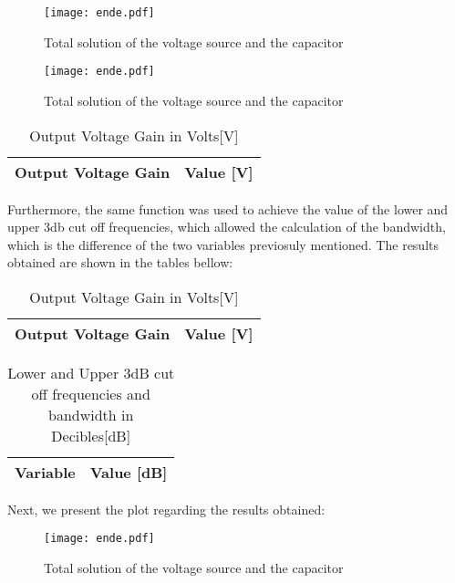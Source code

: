 \begin{figure}[H] \centering
\texttt{[image: ende.pdf]}
\caption{Total solution of the voltage source and the capacitor}
\label{fig:env+vore}
\end{figure}

\begin{figure}[H] \centering
\texttt{[image: ende.pdf]}
\caption{Total solution of the voltage source and the capacitor}
\label{fig:env+vore}
\end{figure}

\begin{table}[H]
  \centering
  \begin{tabular}{|l|r|}
    \hline    
    {\bf Output Voltage Gain} & {\bf Value [V]} \\ \hline
    
  \end{tabular}
  \caption{Output Voltage Gain in Volts[V]}
  \label{tab:gain}
\end{table}


Furthermore, the same function was used to achieve the value of the lower and upper 3db cut off frequencies, which allowed the calculation of the bandwidth, which is the difference of the two variables previosuly mentioned. The results obtained are shown in the tables bellow:

\begin{table}[H]
  \centering
  \begin{tabular}{|l|r|}
    \hline    
    {\bf Output Voltage Gain} & {\bf Value [V]} \\ \hline
    
  \end{tabular}
  \caption{Output Voltage Gain in Volts[V]}
  \label{tab:gain}
\end{table}

\begin{table}[H]
  \centering
  \begin{tabular}{|l|r|}
    \hline    
    {\bf Variable} & {\bf Value [dB]} \\ \hline
    
  \end{tabular}
  \caption{Lower and Upper 3dB cut off frequencies and bandwidth in Decibles[dB]}
  \label{tab:freq}
\end{table}

Next, we present the plot regarding the results obtained:

\begin{figure}[H] \centering
\texttt{[image: ende.pdf]}
\caption{Total solution of the voltage source and the capacitor}
\label{fig:env+vore}
\end{figure}

